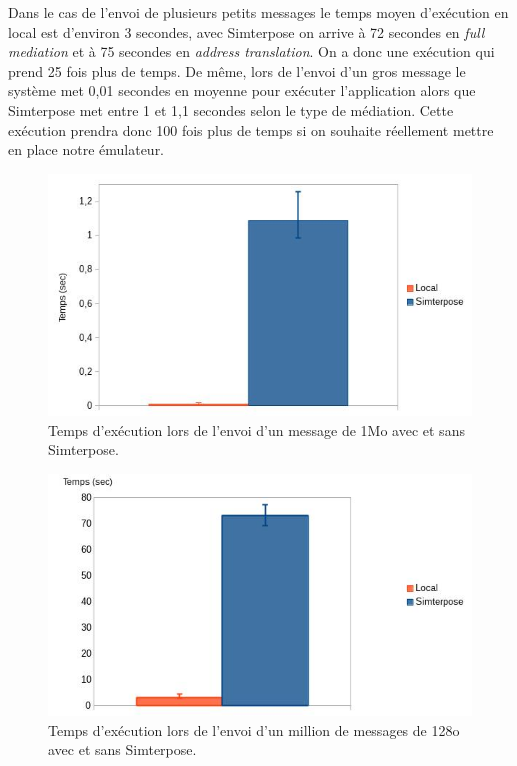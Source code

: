 Dans le cas de l'envoi de plusieurs petits messages le temps moyen d'exécution en local est d'environ 3 secondes, avec Simterpose on arrive à 72 secondes en \textit{full mediation} et à 75 secondes en \textit{address translation}. On a donc une exécution qui prend 25 fois plus de temps. De même, lors de l'envoi d'un gros message le système met 0,01 secondes en moyenne pour exécuter l'application alors que Simterpose met entre 1 et 1,1 secondes selon le type de médiation. Cette exécution prendra donc 100 fois plus de temps si on souhaite réellement mettre en place notre émulateur.

\begin{figure}
  \centering
    \includegraphics[scale=0.5]{mesures/graph/Bigmsg_local.jpg}
    \caption[Temps d'exécution lors de l'envoi d'un message de 1Mo]{Temps d'exécution lors de l'envoi d'un message de 1Mo avec et sans Simterpose.}
    \label{Network_Big_Local}
\end{figure}

\begin{figure}
  \centering
    \includegraphics[scale=0.5]{mesures/graph/Littlemsg_local.jpg}
    \caption[Temps d'exécution lors de l'envoi d'un million de messages de 128o]{Temps d'exécution lors de l'envoi d'un million de messages de 128o avec et sans Simterpose.}
    \label{Network_Little_Local}
\end{figure}
  
